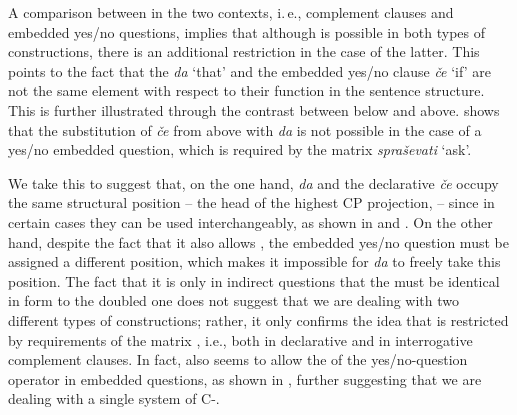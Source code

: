 \documentclass[output=paper,colorlinks,citecolor=brown]{langsci/langscibook}
\begin{document}
\begin{exe}
\end{exe}

\noindent A comparison between  in the two contexts, i.\,e., complement clauses and embedded yes/no questions, implies that although  is possible in both types of constructions, there is an additional restriction in the case of the latter. This points to the fact that the   \textit{da} `that' and the embedded yes/no clause  \textit{če} `if' are not the same element with respect to their function in the sentence structure. This is further illustrated through the contrast between  below and  above.  shows that the substitution of \textit{če} from  above with \textit{da} is not possible in the case of a yes/no embedded question, which is required by the matrix  \textit{spraševati} `ask'.

\begin{exe}
\end{exe}

\noindent We take this to suggest that, on the one hand, \textit{da} and the declarative \textit{če} occupy the same structural position -- the head of the highest CP projection,  -- since in certain cases they can be used interchangeably, as shown in  and . On the other hand, despite the fact that it also allows , the embedded yes/no question  must be assigned a different position, which makes it impossible for \textit{da} to freely take this position. The fact that it is only in indirect questions that the   must be identical in form to the doubled one does not suggest that we are dealing with two different types of  constructions; rather, it only confirms the idea that   is restricted by requirements of the matrix , i.e., both in declarative and in interrogative complement clauses. In fact,  also seems to allow the  of the yes/no-question operator in embedded questions, as shown in , further suggesting that we are dealing with a single system of C-.
\end{document}
